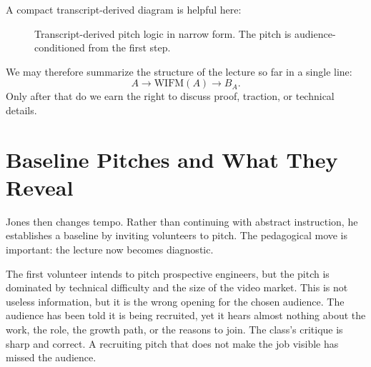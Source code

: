 A compact transcript-derived diagram is helpful here:

\begin{figure}[h]
\centering
{}
\caption{Transcript-derived pitch logic in narrow form. The pitch is audience-conditioned from the first step.}
\end{figure}

We may therefore summarize the structure of the lecture so far in a single line:
\begin{equation}
A \longrightarrow \mathrm{WIFM}(A) \longrightarrow B_A.
\end{equation}
Only after that do we earn the right to discuss proof, traction, or technical details.

\section{Baseline Pitches and What They Reveal}

Jones then changes tempo. Rather than continuing with abstract instruction, he establishes a baseline by inviting volunteers to pitch. The pedagogical move is important: the lecture now becomes diagnostic.

The first volunteer intends to pitch prospective engineers, but the pitch is dominated by technical difficulty and the size of the video market. This is not useless information, but it is the wrong opening for the chosen audience. The audience has been told it is being recruited, yet it hears almost nothing about the work, the role, the growth path, or the reasons to join. The class's critique is sharp and correct. A recruiting pitch that does not make the job visible has missed the audience.

